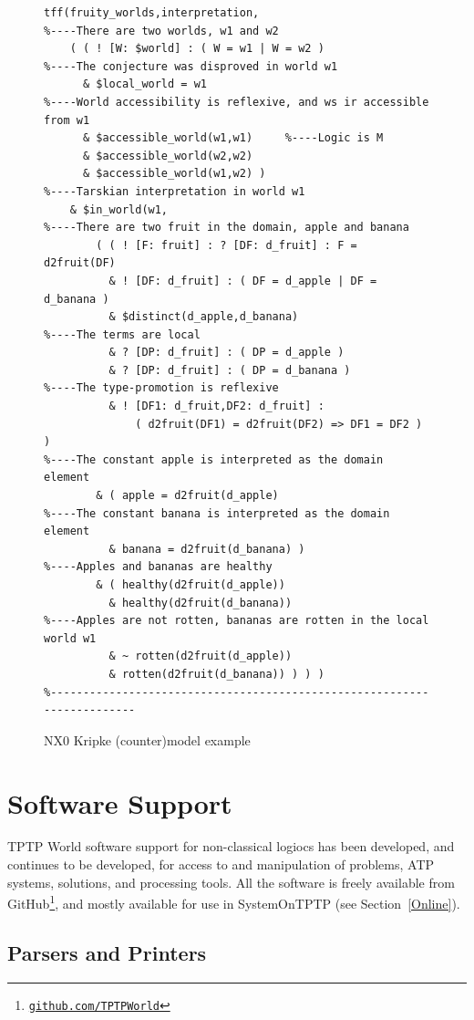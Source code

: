 \documentclass{ceurart}
\begin{document}
\begin{figure}[h!]
\begin{verbatim}
tff(fruity_worlds,interpretation,
%----There are two worlds, w1 and w2
    ( ( ! [W: $world] : ( W = w1 | W = w2 )
%----The conjecture was disproved in world w1
      & $local_world = w1
%----World accessibility is reflexive, and ws ir accessible from w1
      & $accessible_world(w1,w1)     %----Logic is M
      & $accessible_world(w2,w2)
      & $accessible_world(w1,w2) )
%----Tarskian interpretation in world w1
    & $in_world(w1,
%----There are two fruit in the domain, apple and banana
        ( ( ! [F: fruit] : ? [DF: d_fruit] : F = d2fruit(DF)
          & ! [DF: d_fruit] : ( DF = d_apple | DF = d_banana )
          & $distinct(d_apple,d_banana)
%----The terms are local
          & ? [DP: d_fruit] : ( DP = d_apple )
          & ? [DP: d_fruit] : ( DP = d_banana )
%----The type-promotion is reflexive
          & ! [DF1: d_fruit,DF2: d_fruit] :
              ( d2fruit(DF1) = d2fruit(DF2) => DF1 = DF2 ) )
%----The constant apple is interpreted as the domain element
        & ( apple = d2fruit(d_apple)
%----The constant banana is interpreted as the domain element
          & banana = d2fruit(d_banana) )
%----Apples and bananas are healthy
        & ( healthy(d2fruit(d_apple))
          & healthy(d2fruit(d_banana))
%----Apples are not rotten, bananas are rotten in the local world w1
          & ~ rotten(d2fruit(d_apple))
          & rotten(d2fruit(d_banana)) ) ) )
%------------------------------------------------------------------------
\end{verbatim}
\caption{NX0 Kripke (counter)model example}
\label{NX0Kripke}
\end{figure}

\section{Software Support}
\label{SystemsTools}

TPTP World software support for non-classical logiocs has been developed, and continues to be 
developed, for access to and manipulation of problems, ATP systems, solutions, and processing 
tools.
All the software is freely available from GitHub\footnote{%
\href{https://github.com/TPTPWorld}{\tt github.com/TPTPWorld}}, and mostly available for use in 
SystemOnTPTP (see Section~\ref{Online}).

\subsection{Parsers and Printers}
\label{Parsers}
\end{document}
